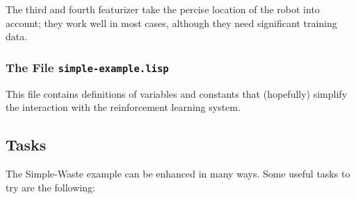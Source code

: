 \documentclass[a4paper]{amsart}
\begin{document}
The third and fourth featurizer take the percise location of the robot
into account; they work well in most cases, although they need
significant training data.

\subsubsection{The File \texttt{simple-example.lisp}}
\label{sec:file-simple-example.lisp}

This file contains definitions of variables and constants that
(hopefully) simplify the interaction with the reinforcement learning
system.

\subsection{Tasks}
\label{sec:tasks}

The Simple-Waste example can be enhanced in many ways.  Some useful
tasks to try are the following:
\end{document}
